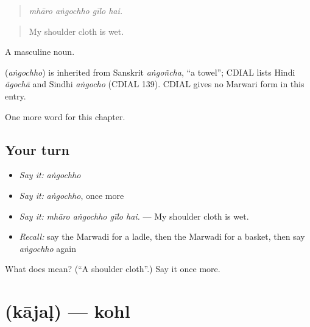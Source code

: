 \begin{quote}
   
\end{quote}

\begin{quote}
\emph{mhāro aṅgochho gīlo hai.}
\end{quote}

\begin{quote}
My shoulder cloth is wet.
\end{quote}

A masculine noun.

\begin{cousinweb}
\textbf{} (\emph{aṅgochho}) is inherited from Sanskrit \emph{aṅgoñcha}, \textquotedblleft{}a towel\textquotedblright{}; CDIAL lists Hindi \emph{ãgochā} and Sindhi \emph{aṅgocho} (CDIAL 139). CDIAL gives no Marwari form in this entry.
\end{cousinweb}

\begin{grammarlens}[title={What you've built}]
One more word for this chapter.
\end{grammarlens}

\subsection*{Your turn}
\begin{itemize}
\raggedright
  \item \emph{Say it:} \emph{aṅgochho}
  \item \emph{Say it:} \emph{aṅgochho}, once more
  \item \emph{Say it:} \emph{mhāro aṅgochho gīlo hai.} — My shoulder cloth is wet.
  \item \emph{Recall:} say the Marwadi for a ladle, then the Marwadi for a basket, then say \emph{aṅgochho} again
\end{itemize}

\begin{tcolorbox}[breakable,colback=teal!4,colframe=teal!35!black,title={Before you move on}]
What does  mean? (\textquotedblleft{}A shoulder cloth\textquotedblright{}.) Say it once more.
\end{tcolorbox}
\section[\texorpdfstring{\mw{काजळ} (kājaḷ)}{काजळ (kājaḷ)}]{ (kājaḷ) — kohl}

\label{lesson:MW-C183-kajal}



